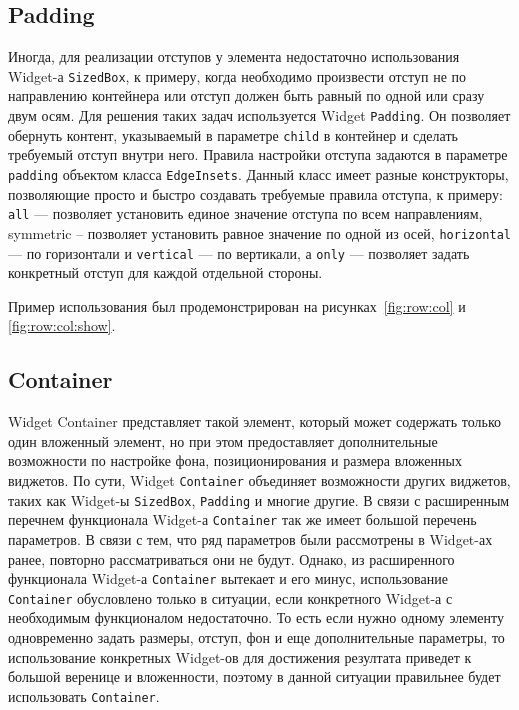 \subsection{Padding}

Иногда, для реализации отступов у элемента недостаточно использования
Widget-а \texttt{SizedBox}, к примеру,
когда необходимо произвести отступ не по направлению контейнера
или отступ должен быть равный по одной или сразу двум осям.
Для решения таких задач используется Widget \texttt{Padding}.
Он позволяет обернуть контент,
указываемый в параметре \texttt{child} в контейнер
и сделать требуемый отступ внутри него.
Правила настройки отступа задаются
в параметре \texttt{padding} объектом класса \texttt{EdgeInsets}.
Данный класс имеет разные конструкторы,
позволяющие просто и быстро создавать требуемые правила отступа, к примеру:
\texttt{all} --- позволяет установить единое значение отступа
по всем направлениям,
symmetric – позволяет установить равное значение по одной из осей,
\texttt{horizontal} --- по горизонтали
и \texttt{vertical} --- по вертикали,
а \texttt{only} --- позволяет задать конкретный отступ
для каждой отдельной стороны.

Пример использования был продемонстрирован
на рисунках~\ref{fig:row:col} и \ref{fig:row:col:show}.

\subsection{Container}

Widget Container представляет такой элемент,
который может содержать только один вложенный элемент,
но при этом предоставляет дополнительные возможности по настройке фона,
позиционирования и размера вложенных виджетов.
По сути, Widget \texttt{Container} объединяет возможности других виджетов,
таких как Widget-ы \texttt{SizedBox}, \texttt{Padding} и многие другие.
В связи с расширенным перечнем функционала Widget-а \texttt{Container}
так же имеет большой перечень параметров.
В связи с тем, что ряд параметров были рассмотрены в Widget-ах ранее,
повторно рассматриваться они не будут.
Однако, из расширенного функционала Widget-а \texttt{Container} вытекает
и его минус, использование \texttt{Container} обусловлено только в ситуации,
если конкретного Widget-а с необходимым функционалом недостаточно.
То есть если нужно одному элементу одновременно задать размеры, отступ,
фон и еще дополнительные параметры, то использование конкретных Widget-ов
для достижения резултата приведет к большой веренице и вложенности,
поэтому в данной ситуации правильнее будет использовать \texttt{Container}.

